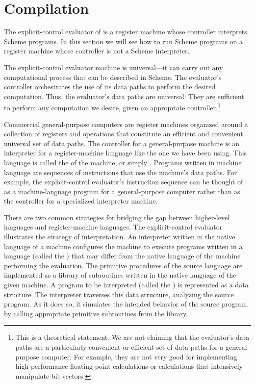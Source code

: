 \section{Compilation}
\label{Section 5.5}

The explicit-control evaluator of  is a register machine whose
controller interprets Scheme programs.  In this section we will see how to run
Scheme programs on a register machine whose controller is not a Scheme
interpreter.

The explicit-control evaluator machine is universal---it can carry out any
computational process that can be described in Scheme.  The evaluator's
controller orchestrates the use of its data paths to perform the desired
computation.  Thus, the evaluator's data paths are universal: They are
sufficient to perform any computation we desire, given an appropriate
controller.\footnote{This is a theoretical statement.  We are not claiming that
the evaluator's data paths are a particularly convenient or efficient set of
data paths for a general-purpose computer.  For example, they are not very good
for implementing high-performance floating-point calculations or calculations
that intensively manipulate bit vectors.}

Commercial general-purpose computers are register machines organized around a
collection of registers and operations that constitute an efficient and
convenient universal set of data paths.  The controller for a general-purpose
machine is an interpreter for a register-machine language like the one we have
been using.  This language is called the  of the
machine, or simply .  Programs written in machine
language are sequences of instructions that use the machine's data paths.  For
example, the explicit-control evaluator's instruction sequence can be thought
of as a machine-language program for a general-purpose computer rather than as
the controller for a specialized interpreter machine.

There are two common strategies for bridging the gap between higher-level
languages and register-machine languages.  The explicit-control evaluator
illustrates the strategy of interpretation.  An interpreter written in the
native language of a machine configures the machine to execute programs written
in a language (called the ) that may differ from the
native language of the machine performing the evaluation.  The primitive
procedures of the source language are implemented as a library of subroutines
written in the native language of the given machine.  A program to be
interpreted (called the ) is represented as a data
structure.  The interpreter traverses this data structure, analyzing the source
program.  As it does so, it simulates the intended behavior of the source
program by calling appropriate primitive subroutines from the library.

